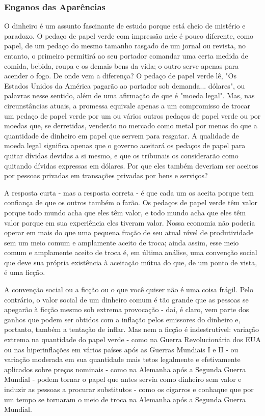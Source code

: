 \documentclass[a4paper,12pt]{article}[abntex2]
\begin{document}
\subsubsection{\textbf{Enganos das Aparências}}
O dinheiro é um assunto fascinante de estudo porque está cheio de mistério e paradoxo. O pedaço de papel verde com impressão nele é pouco diferente, como papel, de um pedaço do mesmo tamanho rasgado de um jornal ou revista, no entanto, o primeiro permitirá ao seu portador comandar uma certa medida de comida, bebida, roupa e os demais bens da vida; o outro serve apenas para acender o fogo. De onde vem a diferença? O pedaço de papel verde lê, "Os Estados Unidos da América pagarão ao portador sob demanda... dólares", ou palavras nesse sentido, além de uma afirmação de que é "moeda legal". Mas, nas circunstâncias atuais, a promessa equivale apenas a um compromisso de trocar um pedaço de papel verde por um ou vários outros pedaços de papel verde ou por moedas que, se derretidas, venderão no mercado como metal por menos do que a quantidade de dinheiro em papel que servem para resgatar. A qualidade de moeda legal significa apenas que o governo aceitará os pedaços de papel para quitar dívidas devidas a si mesmo, e que os tribunais os considerarão como quitando dívidas expressas em dólares. Por que eles também deveriam ser aceitos por pessoas privadas em transações privadas por bens e serviços?

A resposta curta - mas a resposta correta - é que cada um os aceita porque tem confiança de que os outros também o farão. Os pedaços de papel verde têm valor porque todo mundo acha que eles têm valor, e todo mundo acha que eles têm valor porque em sua experiência eles tiveram valor. Nossa economia não poderia operar em mais do que uma pequena fração de seu atual nível de produtividade sem um meio comum e amplamente aceito de troca; ainda assim, esse meio comum e amplamente aceito de troca é, em última análise, uma convenção social que deve sua própria existência à aceitação mútua do que, de um ponto de vista, é uma ficção.

A convenção social ou a ficção ou o que você quiser não é uma coisa frágil. Pelo contrário, o valor social de um dinheiro comum é tão grande que as pessoas se apegarão à ficção mesmo sob extrema provocação - daí, é claro, vem parte dos ganhos que podem ser obtidos com a inflação pelos emissores do dinheiro e, portanto, também a tentação de inflar. Mas nem a ficção é indestrutível: variação extrema na quantidade do papel verde - como na Guerra Revolucionária dos EUA ou nas hiperinflações em vários países após as Guerras Mundiais I e II - ou variação moderada em sua quantidade mais tetos legalmente e efetivamente aplicados sobre preços nominais - como na Alemanha após a Segunda Guerra Mundial - podem tornar o papel que antes servia como dinheiro sem valor e induzir as pessoas a procurar substitutos - como os cigarros e conhaque que por um tempo se tornaram o meio de troca na Alemanha após a Segunda Guerra Mundial.
\end{document}
